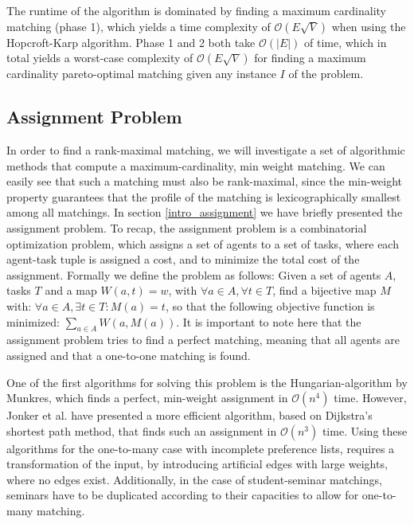 The runtime of the algorithm is dominated by finding a maximum cardinality matching (phase 1), which yields a time complexity of $\mathcal{O}(E\sqrt{V})$\cite{Abraham:Pacha} when using the Hopcroft-Karp algorithm. Phase 1 and 2 both take $\mathcal{O}(|E|)$ of time\cite{SngThesis}, which in total yields a worst-case complexity of $\mathcal{O}(E\sqrt{V})$ for finding a maximum cardinality pareto-optimal matching given any instance $I$ of the problem.

\subsection{Assignment Problem}
In order to find a rank-maximal matching, we will investigate a set of algorithmic methods that compute a maximum-cardinality, min weight matching. We can easily see that such a matching must also be rank-maximal, since the min-weight property guarantees that the profile of the matching is lexicographically smallest among all matchings.
In section \ref{intro_assignment} we have briefly presented the assignment problem. To recap, the assignment problem is a combinatorial optimization problem, which assigns a set of agents to a set of tasks, where each agent-task tuple is assigned a cost, and to minimize the total cost of the assignment. Formally we define the problem as follows: Given a set of agents $A$, tasks $T$ and a map $W(a, t) = w$, with $\forall a \in A, \forall t \in T$, find a bijective map $M$ with: $\forall a \in A, \exists t \in T: M(a) = t$, so that the following objective function is minimized: $\sum_{a \in A} W(a, M(a))$. It is important to note here that the assignment problem tries to find a perfect matching, meaning that all agents are assigned and that a one-to-one matching is found.

One of the first algorithms for solving this problem is the Hungarian-algorithm by Munkres, which finds a perfect, min-weight assignment in $\mathcal{O}(n^4)$ time.\cite{Munkres} However, Jonker et al.\cite{Jonker1987} have presented a more efficient algorithm, based on Dijkstra's shortest path method, that finds such an assignment in $\mathcal{O}(n^3)$ time. Using these algorithms for the one-to-many case with incomplete preference lists, requires a transformation of the input, by introducing artificial edges with large weights, where no edges exist. Additionally, in the case of student-seminar matchings, seminars have to be duplicated according to their capacities to allow for one-to-many matching.
  
